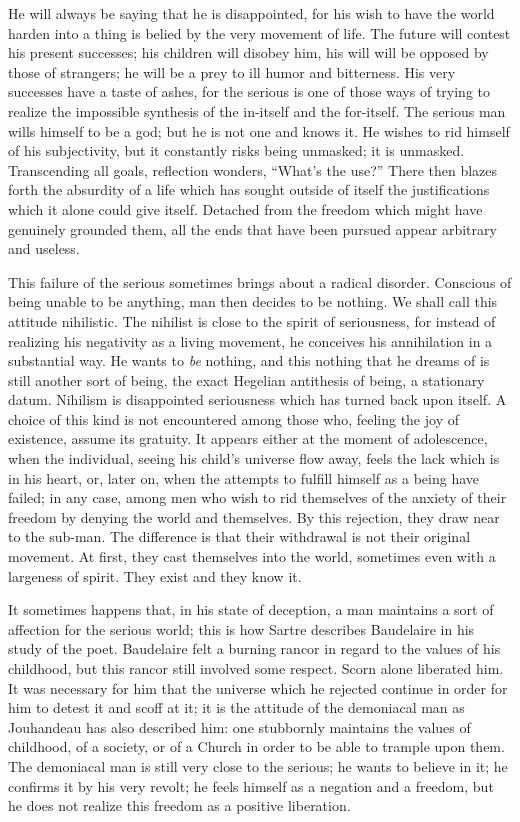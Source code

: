 \documentclass[11pt]{article}
\begin{document}
He will always be saying that he is disappointed, for his wish to have the world harden into a thing is belied by the very movement of life. The future will contest his present successes; his children will disobey him, his will will be opposed by those of strangers; he will be a prey to ill humor and bitterness. His very successes have a taste of ashes, for the serious is one of those ways of trying to realize the impossible synthesis of the in-itself and the for-itself. The serious man wills himself to be a god; but he is not one and knows it. He wishes to rid himself of his subjectivity, but it constantly risks being unmasked; it is unmasked. Transcending all goals, reflection wonders, “What’s the use?” There then blazes forth the absurdity of a life which has sought outside of itself the justifications which it alone could give itself. Detached from the freedom which might have genuinely grounded them, all the ends that have been pursued appear arbitrary and useless.

This failure of the serious sometimes brings about a radical disorder. Conscious of being unable to be anything, man then decides to be nothing. We shall call this attitude nihilistic. The nihilist is close to the spirit of seriousness, for instead of realizing his negativity as a living movement, he conceives his annihilation in a substantial way. He wants to \textit{be} nothing, and this nothing that he dreams of is still another sort of being, the exact Hegelian antithesis of being, a stationary datum. Nihilism is disappointed seriousness which has turned back upon itself. A choice of this kind is not encountered among those who, feeling the joy of existence, assume its gratuity. It appears either at the moment of adolescence, when the individual, seeing his child’s universe flow away, feels the lack which is in his heart, or, later on, when the attempts to fulfill himself as a being have failed; in any case, among men who wish to rid themselves of the anxiety of their freedom by denying the world and themselves. By this rejection, they draw near to the sub-man. The difference is that their withdrawal is not their original movement. At first, they cast themselves into the world, sometimes even with a largeness of spirit. They exist and they know it.

It sometimes happens that, in his state of deception, a man maintains a sort of affection for the serious world; this is how Sartre describes Baudelaire in his study of the poet. Baudelaire felt a burning rancor in regard to the values of his childhood, but this rancor still involved some respect. Scorn alone liberated him. It was necessary for him that the universe which he rejected continue in order for him to detest it and scoff at it; it is the attitude of the demoniacal man as Jouhandeau has also described him: one stubbornly maintains the values of childhood, of a society, or of a Church in order to be able to trample upon them. The demoniacal man is still very close to the serious; he wants to believe in it; he confirms it by his very revolt; he feels himself as a negation and a freedom, but he does not realize this freedom as a positive liberation.
\end{document}

